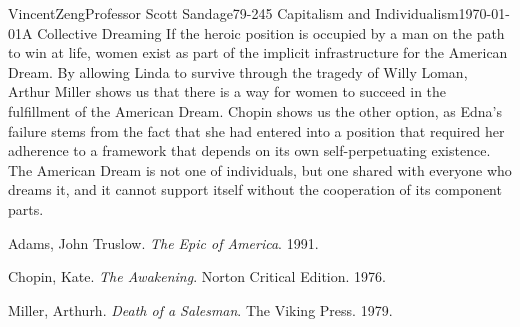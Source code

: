 \documentclass[12pt]{article}
\begin{document}
\begin{mla}{Vincent}{Zeng}{Professor Scott Sandage}{79-245 Capitalism and Individualism}{\today}{A Collective Dreaming}
If the heroic position is occupied by a man on the path to win at
life, women exist as part of the implicit infrastructure for the American
Dream. By allowing Linda to survive through the tragedy of Willy Loman, Arthur
Miller shows us that there is a way for women to succeed in the fulfillment of
the American Dream. Chopin shows us the other option, as
Edna's failure stems from the fact that she had entered into a position that
required her adherence to a framework that depends on its own
self-perpetuating existence. The American Dream is not one of individuals, but
one shared with everyone who dreams it, and it cannot support itself without
the cooperation of its component parts.
\end{mla}
\begin{workscited}
	\bibent
	Adams, John Truslow. \textit{The Epic of America}. 1991.

	\bibent
	Chopin, Kate. \textit{The Awakening}. Norton Critical Edition. 1976.

	\bibent
	Miller, Arthurh. \textit{Death of a Salesman}. The Viking Press. 1979.
\end{workscited}
\end{document}
